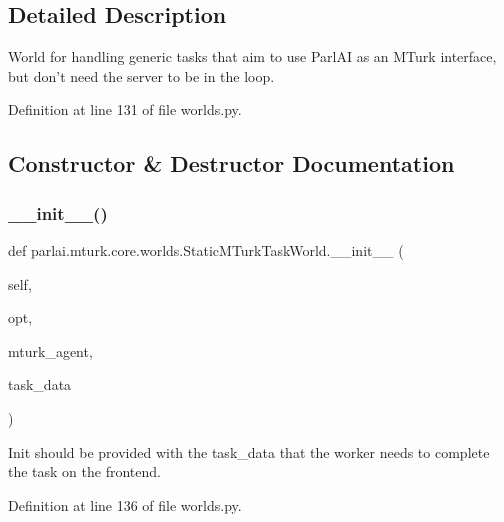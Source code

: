 \subsection{Detailed Description}
\begin{DoxyVerb}World for handling generic tasks that aim to use ParlAI as an MTurk
interface, but don't need the server to be in the loop.
\end{DoxyVerb}
 

Definition at line 131 of file worlds.\+py.



\subsection{Constructor \& Destructor Documentation}
\mbox{\label{classparlai_1_1mturk_1_1core_1_1worlds_1_1StaticMTurkTaskWorld_a6bf4b23fee7509456b074b9587043d17}} 
\subsubsection{\texorpdfstring{\+\_\+\+\_\+init\+\_\+\+\_\+()}{\_\_init\_\_()}}
{\footnotesize\ttfamily def parlai.\+mturk.\+core.\+worlds.\+Static\+M\+Turk\+Task\+World.\+\_\+\+\_\+init\+\_\+\+\_\+ (\begin{DoxyParamCaption}\item[{}]{self,  }\item[{}]{opt,  }\item[{}]{mturk\+\_\+agent,  }\item[{}]{task\+\_\+data }\end{DoxyParamCaption})}

\begin{DoxyVerb}Init should be provided with the task_data that the worker needs
to complete the task on the frontend.
\end{DoxyVerb}
 

Definition at line 136 of file worlds.\+py.



